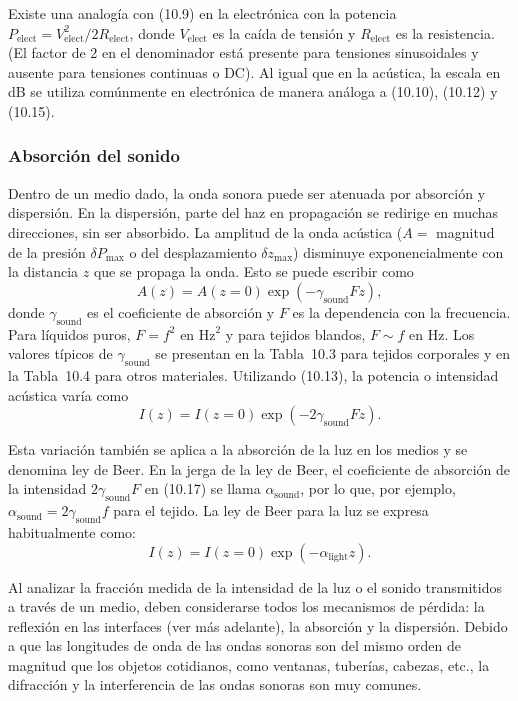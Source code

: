 \documentclass[12pt]{book}
\begin{document}
Existe una analogía con (10.9) en la electrónica con la potencia $P_{\text{elect}} = V_{\text{elect}}^2/2R_{\text{elect}}$, donde $V_{\text{elect}}$ es la caída de tensión y $R_{\text{elect}}$ es la resistencia. (El factor de 2 en el denominador está presente para tensiones sinusoidales y ausente para tensiones continuas o DC). Al igual que en la acústica, la escala en dB se utiliza comúnmente en electrónica de manera análoga a (10.10), (10.12) y (10.15).

\subsubsection*{Absorción del sonido}

Dentro de un medio dado, la onda sonora puede ser atenuada por absorción y dispersión. En la dispersión, parte del haz en propagación se redirige en muchas direcciones, sin ser absorbido. La amplitud de la onda acústica ($A =$ magnitud de la presión $\delta P_{\text{max}}$ o del desplazamiento $\delta z_{\text{max}}$) disminuye exponencialmente con la distancia $z$ que se propaga la onda. Esto se puede escribir como
\begin{equation}
A(z) = A(z = 0)\exp(-\gamma_{\text{sound}}Fz),
\label{eq:10.16}
\end{equation}
donde $\gamma_{\text{sound}}$ es el coeficiente de absorción y $F$ es la dependencia con la frecuencia. Para líquidos puros, $F = f^2$ en $\text{Hz}^2$ y para tejidos blandos, $F \sim f$ en $\text{Hz}$. Los valores típicos de $\gamma_{\text{sound}}$ se presentan en la Tabla~10.3 para tejidos corporales y en la Tabla~10.4 para otros materiales. Utilizando (10.13), la potencia o intensidad acústica varía como
\begin{equation}
I(z) = I(z = 0)\exp(-2\gamma_{\text{sound}}Fz).
\label{eq:10.17}
\end{equation}

Esta variación también se aplica a la absorción de la luz en los medios y se denomina ley de Beer. En la jerga de la ley de Beer, el coeficiente de absorción de la intensidad $2\gamma_{\text{sound}}F$ en (10.17) se llama $\alpha_{\text{sound}}$, por lo que, por ejemplo, $\alpha_{\text{sound}} = 2\gamma_{\text{sound}}f$ para el tejido. La ley de Beer para la luz se expresa habitualmente como:
\begin{equation}
I(z) = I(z = 0)\exp(-\alpha_{\text{light}}z).
\label{eq:10.18}
\end{equation}

Al analizar la fracción medida de la intensidad de la luz o el sonido transmitidos a través de un medio, deben considerarse todos los mecanismos de pérdida: la reflexión en las interfaces (ver más adelante), la absorción y la dispersión. Debido a que las longitudes de onda de las ondas sonoras son del mismo orden de magnitud que los objetos cotidianos, como ventanas, tuberías, cabezas, etc., la difracción y la interferencia de las ondas sonoras son muy comunes.
\end{document}
